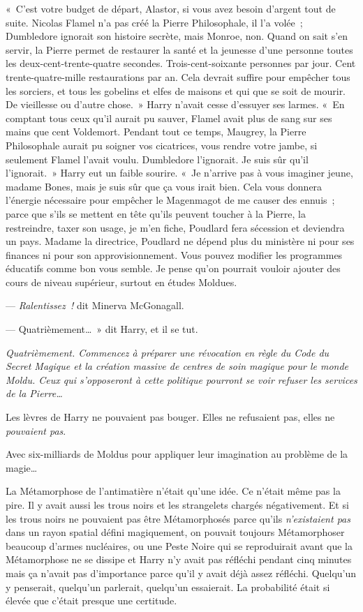«~C'est votre budget de départ, Alastor, si vous avez besoin d'argent tout de suite.
Nicolas Flamel n'a pas créé la Pierre Philosophale, il l'a volée~; Dumbledore ignorait son histoire secrète, mais Monroe, non.
Quand on sait s'en servir, la Pierre permet de restaurer la santé et la jeunesse d'une personne toutes les deux-cent-trente-quatre secondes.
Trois-cent-soixante personnes par jour.
Cent trente-quatre-mille restaurations par an.
Cela devrait suffire pour empêcher tous les sorciers, et tous les gobelins et elfes de maisons et qui que se soit de mourir.
De vieillesse ou d'autre chose.~»
Harry n'avait cesse d'essuyer ses larmes.
«~En comptant tous ceux qu'il aurait pu sauver, Flamel avait plus de sang sur ses mains que cent Voldemort.
Pendant tout ce temps, Maugrey, la Pierre Philosophale aurait pu soigner vos cicatrices, vous rendre votre jambe, si seulement Flamel l'avait voulu.
Dumbledore l'ignorait.
Je suis sûr qu'il l'ignorait.~»
Harry eut un faible sourire.
«~Je n'arrive pas à vous imaginer jeune, madame Bones, mais je suis sûr que ça vous irait bien.
Cela vous donnera l'énergie nécessaire pour empêcher le Magenmagot de me causer des ennuis~; parce que s'ils se mettent en tête qu'ils peuvent toucher à la Pierre, la restreindre, taxer son usage, je m'en fiche, Poudlard fera sécession et deviendra un pays.
Madame la directrice, Poudlard ne dépend plus du ministère ni pour ses finances ni pour son approvisionnement.
Vous pouvez modifier les programmes éducatifs comme bon vous semble.
Je pense qu'on pourrait vouloir ajouter des cours de niveau supérieur, surtout en études Moldues.

--- \emph{Ralentissez~!} dit Minerva McGonagall.

--- Quatrièmement…~»
dit Harry, et il se tut.

\emph{Quatrièmement.
Commencez à préparer une révocation en règle du Code du Secret Magique et la création massive de centres de soin magique pour le monde Moldu.
Ceux qui s'opposeront à cette politique pourront se voir refuser les services de la Pierre…}

Les lèvres de Harry ne pouvaient pas bouger.
Elles ne refusaient pas, elles ne \emph{pouvaient pas}.

Avec six-milliards de Moldus pour appliquer leur imagination au problème de la magie…

La Métamorphose de l'antimatière n'était qu'une idée.
Ce n'était même pas la pire.
Il y avait aussi les trous noirs et les strangelets chargés négativement.
Et si les trous noirs ne pouvaient pas être Métamorphosés parce qu'ils \emph{n'existaient pas} dans un rayon spatial défini magiquement, on pouvait toujours Métamorphoser beaucoup d'armes nucléaires, ou une Peste Noire qui se reproduirait avant que la Métamorphose ne se dissipe et Harry n'y avait pas réfléchi pendant cinq minutes mais ça n'avait pas d'importance parce qu'il y avait déjà assez réfléchi.
Quelqu'un y penserait, quelqu'un parlerait, quelqu'un essaierait.
La probabilité était si élevée que c'était presque une certitude.

